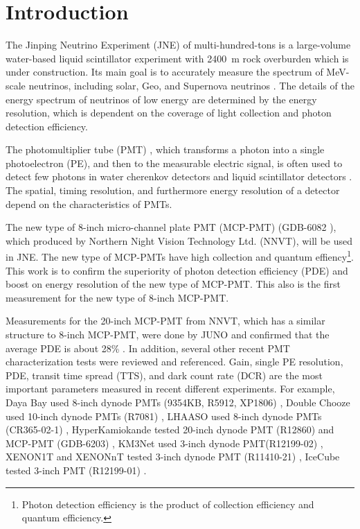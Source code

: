 \section{Introduction}
The Jinping Neutrino Experiment (JNE) of multi-hundred-tons is a large-volume water-based liquid scintillator experiment with \SI{2400}{m} rock overburden \cite{LetterJNE2017} which is under construction. Its main goal is to accurately measure the spectrum of MeV-scale neutrinos, including solar, Geo, and Supernova neutrinos \cite{LetterJNE2017}. The details of the energy spectrum of neutrinos of low energy are determined by the energy resolution, which is dependent on the coverage of light collection and photon detection efficiency.

The photomultiplier tube (PMT) \cite{HAMAMATSUManual}, which transforms a photon into a single photoelectron (PE), and then to the measurable electric signal, is often used to detect few photons in water cherenkov detectors \cite{SNO,SuperK} and liquid scintillator detectors \cite{KamLAND,JUNO:2015zny}. The spatial, timing resolution, and furthermore energy resolution of a detector depend on the characteristics of PMTs.

The new type of 8-inch micro-channel plate PMT (MCP-PMT) (GDB-6082 \cite{GDB-6082}), which produced by Northern Night Vision Technology Ltd. (NNVT), will be used in JNE. The new type of MCP-PMTs have high collection and quantum effiency\footnote{Photon detection efficiency is the product of collection efficiency and quantum efficiency.}. This work is to confirm the superiority of photon detection efficiency (PDE) and boost on energy resolution of the new type of MCP-PMT. This also is the first measurement for the new type of 8-inch MCP-PMT.

Measurements for the 20-inch MCP-PMT from NNVT, which has a similar structure to 8-inch MCP-PMT, were done by JUNO and confirmed that the average PDE is about 28\% \cite{JUNOMassTesting}. In addition, several other recent PMT characterization tests were reviewed and referenced. Gain, single PE resolution, PDE, transit time spread (TTS), and dark count rate (DCR) are the most important parameters measured in recent different experiments. For example, Daya Bay used 8-inch dynode PMTs (9354KB, R5912, XP1806) \cite{DayaBayTesting}, Double Chooze used 10-inch dynode PMTs (R7081) \cite{DoubleChoozeTesting}, LHAASO used 8-inch dynode PMTs (CR365-02-1) \cite{LHAASOTesting}, HyperKamiokande tested 20-inch dynode PMT (R12860) and MCP-PMT (GDB-6203) \cite{HyperKTesting}, KM3Net used 3-inch dynode PMT(R12199-02) \cite{KM3NetTesting}, XENON1T and XENONnT tested 3-inch dynode PMT (R11410-21) \cite{XENON1TTesting}\cite{XENONnTTesting}, IceCube tested 3-inch PMT (R12199-01) \cite{IceCubeTesting}.

